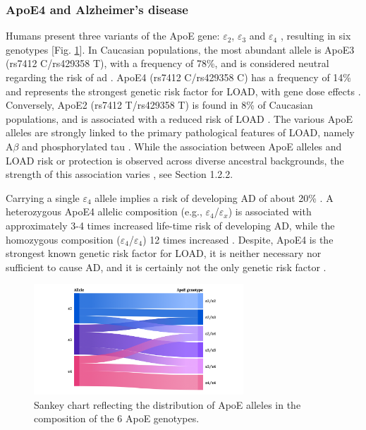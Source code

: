 \documentclass{amsart}
\begin{document}
\subsubsection{ApoE4 and Alzheimer's disease}
Humans present three variants of the ApoE gene: $\varepsilon_2$, $\varepsilon_3$ and $\varepsilon_4$ \cite{Husain2021APOETherapeutics, Yang2023ApolipoproteinDisease}, resulting in six genotypes [Fig. \ref{fig1}]. In Caucasian populations, the most abundant allele is ApoE3 (rs7412 C/rs429358 T), with a frequency of 78\%, and is considered neutral regarding the risk of \acrshort{ad} \cite{Liu2013ApolipoproteinTherapy}. ApoE4 (rs7412 C/rs429358 C) has a frequency of 14\% and represents the strongest genetic risk factor for LOAD, with gene dose effects \cite{Strittmatter1993ApolipoproteinDisease}. Conversely, ApoE2 (rs7412 T/rs429358 T) is found in 8\% of Caucasian populations, and is associated with a reduced risk of LOAD \cite{Liu2013ApolipoproteinTherapy}. The various ApoE alleles are strongly linked to the primary pathological features of LOAD, namely A$\beta$ and phosphorylated tau \cite{Deming2017Genome-wideModifiers}. While the association between ApoE alleles and LOAD risk or protection is observed across diverse ancestral backgrounds, the strength of this association varies \cite{Belloy2019AForward, Farrer1997EffectsMeta-analysis}, see Section 1.2.2.

Carrying a single $\varepsilon_4$ allele implies a risk of developing AD of about 20\% \cite{Bookheimer2009APOE4GA}. A heterozygous ApoE4 allelic composition (e.g., $\varepsilon_4$/$\varepsilon_x$) is associated with approximately 3-4 times increased life-time risk of developing AD, while the homozygous composition ($\varepsilon_4$/$\varepsilon_4$) 12 times increased \cite{Kim2009TheRO}. Despite, ApoE4 is the strongest known genetic risk factor for LOAD, it is neither necessary nor sufficient to cause AD, and it is certainly not the only genetic risk factor \cite{SerranoPozo2019IsAD}.

\begin{figure}[H]
  \includegraphics[width=0.7\textwidth]{figures/ApoE@2x.png}
    \caption{Sankey chart reflecting the distribution of ApoE alleles in the composition of the 6 ApoE genotypes.}
  \label{fig1}
\end{figure}
\end{document}

